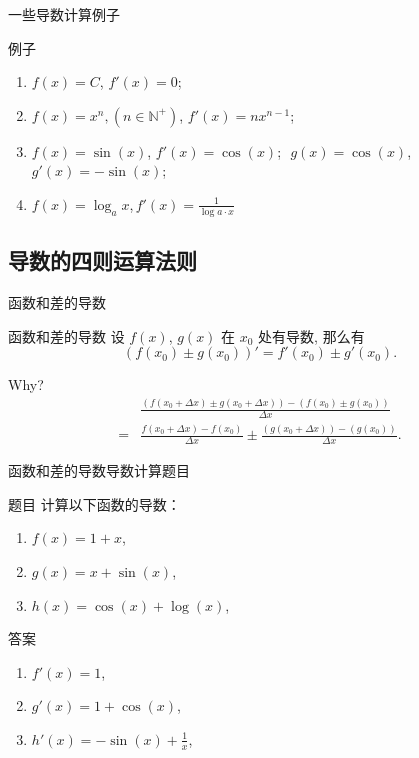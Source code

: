 \documentclass[
10pt,
aspectratio=43,
]{beamer}
\begin{document}
\begin{frame}{一些导数计算例子}
	\begin{block}{例子}
		\begin{enumerate}
			\item $f(x)=C$, \pause $f'(x) =0$;\pause
			\item $f(x)=x^n, (n\in\mathbb{N}^+)$, \pause $f'(x) = n x^{n-1}$;\pause
			\item $f(x)=\sin(x)$, \pause $f'(x)=\cos(x)$; \,\,\pause $g(x)=\cos(x)$, \pause $g'(x)=-\sin(x)$;\pause
			\item $f(x)=\log_a  x$,\,\pause $f'(x)= \displaystyle\frac{1}{\log a\cdot x}$
		\end{enumerate}
	\end{block}
\end{frame}

\subsection{导数的四则运算法则}
\begin{frame}{函数和差的导数}
	\begin{block}{函数和差的导数}
		设 $f(x)$, $g(x)$ 在 $x_0$ 处有导数, 那么有
		\[
			(f(x_0)\pm g(x_0))' = f'(x_0)\pm g'(x_0).
		\]
	\end{block}
	\pause
	Why?
	\pause
	\begin{align*}
		  & \frac{(f(x_0+\Delta x)\pm g(x_0+\Delta x))-(f(x_0)\pm g(x_0))}{\Delta x}                  \\
		= & \frac{f(x_0+\Delta x)-f(x_0)}{\Delta x}\pm \frac{( g(x_0+\Delta x))-( g(x_0))}{\Delta x}.
	\end{align*}
\end{frame}

\begin{frame}{函数和差的导数}{导数计算题目}
	\begin{block}{题目}
		计算以下函数的导数：
		\begin{enumerate}
			\item $f(x) = 1 + x$,
			\item $g(x) = x + \sin(x)$,
			\item $h(x) = \cos(x) + \log(x)$,
		\end{enumerate}
	\end{block}

	\pause

	\begin{block}{答案}
		\begin{enumerate}
			\item $f'(x) = 1$,
			\item $g'(x) = 1 + \cos(x)$,
			\item $h'(x) = -\sin(x) + \displaystyle\frac{1}{x}$,
		\end{enumerate}
	\end{block}
\end{frame}
\end{document}
